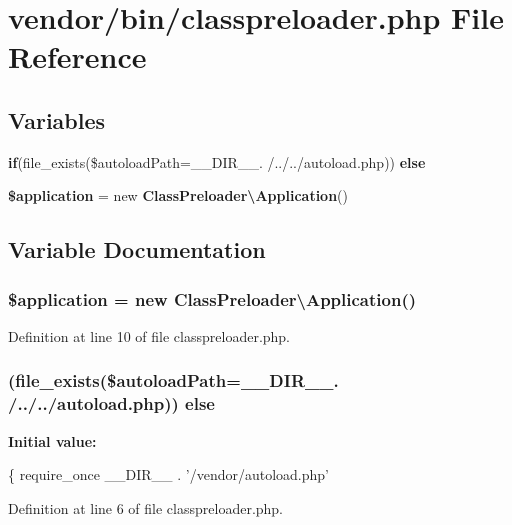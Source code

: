 \section{vendor/bin/classpreloader.php File Reference}
\label{bin_2classpreloader_8php}
\subsection*{Variables}
\begin{DoxyCompactItemize}
\item 
{\bf if}(file\+\_\+exists(\$autoload\+Path=\+\_\+\+\_\+\+D\+I\+R\+\_\+\+\_\+. \textquotesingle{}/../../autoload.\+php\textquotesingle{})) {\bf else}
\item 
{\bf \$application} = new {\bf Class\+Preloader\textbackslash{}\+Application}()
\end{DoxyCompactItemize}


\subsection{Variable Documentation}
\subsubsection[{\$application}]{\setlength{\rightskip}{0pt plus 5cm}\$application = new {\bf Class\+Preloader\textbackslash{}\+Application}()}\label{bin_2classpreloader_8php_a537fa9b460dddc2a67074faab810398a}


Definition at line 10 of file classpreloader.\+php.

\subsubsection[{else}]{ (file\+\_\+exists(\$autoload\+Path=\+\_\+\+\_\+\+D\+I\+R\+\_\+\+\_\+. \textquotesingle{}/../../autoload.\+php\textquotesingle{})) else}\label{bin_2classpreloader_8php_ac26eda928b6a866afa0910425a04a6aa}
{\bfseries Initial value\+:}
\begin{DoxyCode}
\{
    require\_once \_\_DIR\_\_ . \textcolor{stringliteral}{'/vendor/autoload.php'}
\end{DoxyCode}


Definition at line 6 of file classpreloader.\+php.


